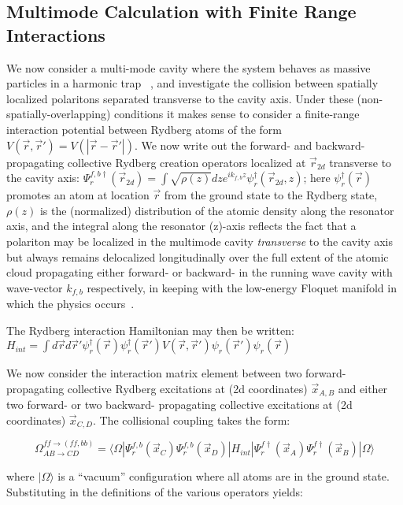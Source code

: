 \documentclass[aps,pra,twocolumn,groupedaddress,10pt,showpacs]{revtex4-1}
\begin{document}
\subsection{Multimode Calculation with Finite Range Interactions}
We now consider a multi-mode cavity where the system behaves as massive particles in a harmonic trap ~\cite{somm2015quan}, and investigate the collision between spatially localized polaritons separated transverse to the cavity axis. Under these (non-spatially-overlapping) conditions it makes sense to consider a finite-range interaction potential between Rydberg atoms of the form $V(\vec{r},\vec{r}')=V(|\vec{r}-\vec{r}'|)$. We now write out the forward- and backward- propagating collective Rydberg creation operators localized at $\vec{r}_{2d}$ transverse to the cavity axis: $\Psi_r^{{f,b}\dagger}(\vec{r}_{2d})=\int\sqrt{\rho(z)}dz e^{i k_{f,b} z} \psi_r^\dagger(\vec{r}_{2d},z)$; here $\psi_r^\dagger(\vec{r})$ promotes an atom at location $\vec{r}$ from the ground state to the Rydberg state, $\rho(z)$ is the (normalized) distribution of the atomic density along the resonator axis, and the integral along the resonator (z)-axis reflects the fact that a polariton may be localized in the multimode cavity \emph{transverse} to the cavity axis but always remains delocalized longitudinally over the full extent of the atomic cloud propagating either forward- or backward- in the running wave cavity with wave-vector $k_{f,b}$ respectively, in keeping with the low-energy Floquet manifold in which the physics occurs~\cite{sommer2016engineering}.

The Rydberg interaction Hamiltonian may then be written: $H_{int}=\int d\vec{r} d\vec{r}' \psi_r^\dagger(\vec{r})\psi_r^\dagger(\vec{r}')V(\vec{r},\vec{r}')\psi_r(\vec{r}')\psi_r(\vec{r})$

We now consider the interaction matrix element between two forward-propagating collective Rydberg excitations at (2d coordinates) $\vec{x}_{A,B}$ and either two forward- or two backward- propagating collective excitations at (2d coordinates) $\vec{x}_{C,D}$. The collisional coupling takes the form:

\begin{equation}
\Omega_{AB\rightarrow CD}^{ff\rightarrow(ff,bb)}=\langle \Omega|\Psi_r^{f,b}(\vec{x}_C)\Psi_r^{f,b}(\vec{x}_D) | H_{int} |\Psi_r^{f\dagger}(\vec{x}_A)\Psi_r^{f\dagger}(\vec{x}_B) | \Omega \rangle
\end{equation}

where $|\Omega\rangle$ is a ``vacuum'' configuration where all atoms are in the ground state. Substituting in the definitions of the various operators yields:
\end{document}
